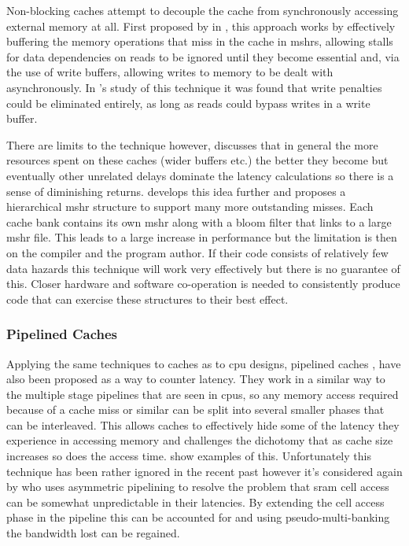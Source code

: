 \label{sec:non-blocking}

Non-blocking caches attempt to decouple the cache from synchronously accessing external memory at all. First proposed by \citet{kroftLockupfreeInstructionFetch1981} in \citeyear{kroftLockupfreeInstructionFetch1981}, this approach works by effectively buffering the memory operations that miss in the cache in \gls{mshr}s, allowing stalls for data dependencies on reads to be ignored until they become essential and, via the use of write buffers, allowing writes to memory to be dealt with asynchronously. In \citet{chenReducingMemoryLatency1992}'s study of this technique it was found that write penalties could be eliminated entirely, as long as reads could bypass writes in a write buffer. 

There are limits to the technique however, \citet{belaynehDiscussionNonblockingLockupfree1996} discusses that in general the more resources spent on these caches (wider buffers etc.) the better they become but eventually other unrelated delays dominate the latency calculations so there is a sense of diminishing returns. \citet{tuckScalableCacheMiss2006} develops this idea further and proposes a hierarchical \gls{mshr} structure to support many more outstanding misses. Each cache bank contains its own \gls{mshr} along with a bloom filter that links to a large \gls{mshr} file. This leads to a large increase in performance but the limitation is then on the compiler and the program author. If their code consists of relatively few data hazards this technique will work very effectively but there is no guarantee of this. Closer hardware and software co-operation is needed to consistently produce code that can exercise these structures to their best effect.

\subsubsection{Pipelined Caches}

Applying the same techniques to caches as to \gls{cpu} designs, pipelined caches \cite{olukotunMultilevelOptimizationPipelined1997, olukotunPerformanceOptimizationPipelined1992}, have also been proposed as a way to counter latency. They work in a similar way to the multiple stage pipelines that are seen in \gls{cpu}s, so any memory access required because of a cache miss or similar can be split into several smaller phases that can be interleaved. This allows caches to effectively hide some of the latency they experience in accessing memory and challenges the dichotomy that as cache size increases so does the access time. \citet{srivastava190MHzCMOS4Kbyte1995, agarwalExploringHighBandwidth2003, martinDesignAsynchronousMIPS1997} show examples of this. Unfortunately this technique has been rather ignored  in the recent past however it's considered again by \citet{hongAVICAAccesstimeVariation2013} who uses asymmetric pipelining to resolve the problem that \gls{sram} cell access can be somewhat unpredictable in their latencies. By extending the cell access phase in the pipeline this can be accounted for and using pseudo-multi-banking the bandwidth lost can be regained.

